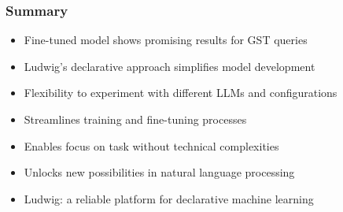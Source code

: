 \begin{frame}[fragile]\frametitle{Summary}
\begin{itemize}
\item Fine-tuned model shows promising results for GST queries
\item Ludwig's declarative approach simplifies model development
\item Flexibility to experiment with different LLMs and configurations
\item Streamlines training and fine-tuning processes
\item Enables focus on task without technical complexities
\item Unlocks new possibilities in natural language processing
\item Ludwig: a reliable platform for declarative machine learning
\end{itemize}
\end{frame}

